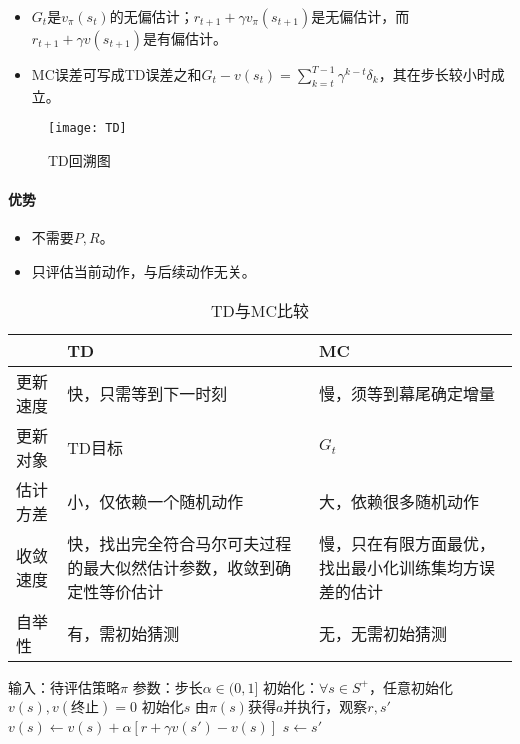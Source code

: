 \documentclass[
12pt, %
a4paper, 
oneside, %
headinclude,footinclude, %
]{scrartcl}
\begin{document}
\begin{itemize}
\item $ G_t $是$ v_{\pi}(s_t) $的无偏估计；$ r_{t + 1} + \gamma v_{\pi}(s_{t + 1}) $是无偏估计，而$ r_{t + 1} + \gamma v(s_{t + 1}) $是有偏估计。
\item MC误差可写成TD误差之和$ G_t - v(s_t) = \sum_{k = t}^{T - 1} \gamma^{k - t} \delta_k $，其在步长较小时成立。
\end{itemize}

\begin{figure}[H]
\centering
\texttt{[image: TD]}
\caption{TD回溯图}
\end{figure}
\paragraph{优势}
\begin{itemize}
\item 不需要$ P,R $。
\item 只评估当前动作，与后续动作无关。
\end{itemize}

\begin{table}[H]
\centering
\begin{tabular}{|p{3cm}|p{5.5cm}|p{5.5cm}|}
\hline
& TD & MC \\
\hline
更新速度 & 快，只需等到下一时刻 & 慢，须等到幕尾确定增量 \\
\hline
更新对象 & TD目标 & $ G_t $ \\
\hline
估计方差 & 小，仅依赖一个随机动作 & 大，依赖很多随机动作 \\
\hline
收敛速度 & 快，找出完全符合马尔可夫过程的最大似然估计参数，收敛到确定性等价估计 & 慢，只在有限方面最优，找出最小化训练集均方误差的估计 \\
\hline
自举性 & 有，需初始猜测 & 无，无需初始猜测 \\
\hline
\end{tabular}
\caption{TD与MC比较}
\end{table}
\begin{myalgorithm}[TD($ 0 $)]
\State 输入：待评估策略$ \pi $
\State 参数：步长$ \alpha \in (0, 1] $
\State 初始化：$ \forall s \in S^+ $，任意初始化$ v(s), v(\text{终止}) = 0 $
\State 初始化$ s $
\State 由$ \pi(s) $获得$ a $并执行，观察$ r, s' $
\State $ v(s) \gets v(s) + \alpha[r + \gamma v(s') - v(s)] $
\State $ s \gets s' $
\EndWhile
\EndFor
\end{myalgorithm}
\end{document}
